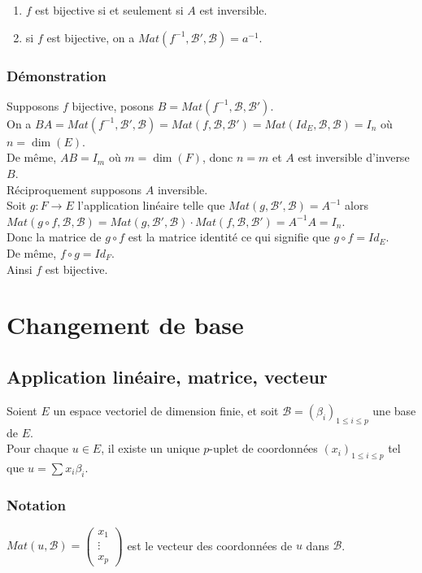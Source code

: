 \documentclass[a4paper,10pt]{book} %
\newcommand{\B}{\mathcal{B}}
\begin{document}
\begin{enumerate}
\item $f$ est bijective si et seulement si $A$ est inversible.
\item si $f$ est bijective, on a $Mat(f^{-1},\B',\B)=a^{-1}$.
\end{enumerate}

\subsubsection{Démonstration}
Supposons $f$ bijective, posons $B=Mat(f^{-1},\B,\B')$.\\
On a $BA=Mat(f^{-1},\B',\B) =Mat(f,\B,\B') =Mat(Id_E,\B,\B) =I_n$ où $n=\dim(E)$. \\

De même, $AB=I_m$ où $m=\dim(F)$, donc $n=m$ et $A$ est inversible d'inverse $B$.\\

Réciproquement supposons $A$ inversible.\\
Soit $g:F\rightarrow E$ l'application linéaire telle que $Mat(g,\B',\B)=A^{-1}$ alors\\
$Mat(g\circ f,\B,\B)=Mat(g,\B',\B)\cdot Mat(f,\B,\B')=A^{-1}A=I_n$.\\

Donc la matrice de $g\circ f$ est la matrice identité ce qui signifie que $g\circ f=Id_E$.\\
De même, $f\circ g=Id_F$.\\

Ainsi $f$ est bijective.

\newpage

\section{Changement de base}
\subsection{Application linéaire, matrice, vecteur}
Soient $E$ un espace vectoriel de dimension finie, et soit $\B=(\beta_i)_{1\leq i\leq p}$ une base de $E$.\\
Pour chaque $u\in E$, il existe un unique $p$-uplet de coordonnées $(x_i)_{1\leq i\leq p}$ tel que
$u=\sum x_i\beta_i$.

\subsubsection{Notation}
$Mat(u,\B)=\begin{pmatrix}
x_1 \\ \vdots \\ x_p
\end{pmatrix}$ est le vecteur des coordonnées de $u$ dans $\B$.
\end{document}
